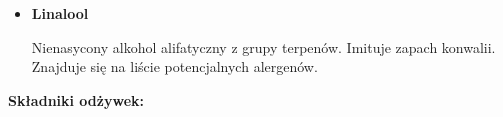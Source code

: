 \begin{itemize}
\item \textbf{Linalool}

Nienasycony alkohol alifatyczny z grupy terpenów. Imituje zapach konwalii. Znajduje się na liście potencjalnych alergenów.




\end{itemize}

\textbf{Składniki odżywek:}

